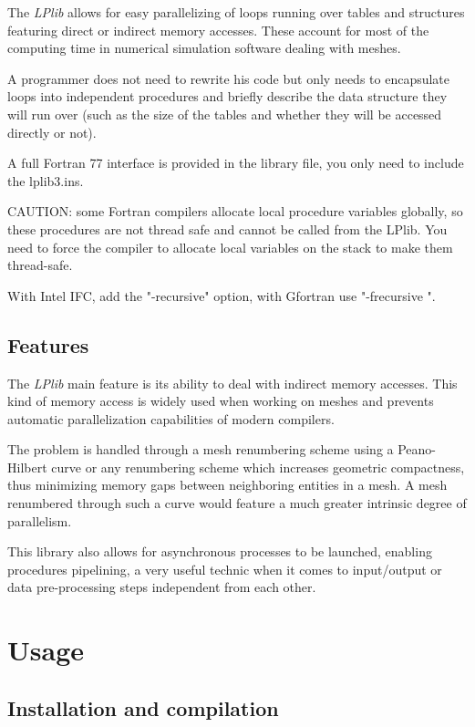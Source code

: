 \documentclass[a4paper,12pt]{article}
\begin{document}
The \emph{LPlib} allows for easy parallelizing of loops running over tables and structures featuring direct or indirect memory accesses. These account for most of the computing time in numerical simulation software dealing with meshes.

A programmer does not need to rewrite his code but only needs to encapsulate loops into independent procedures and briefly describe the data structure they will run over (such as the size of the tables and whether they will be accessed directly or not).

A full Fortran 77 interface is provided in the library file, you only need to include the lplib3.ins.

CAUTION: some Fortran compilers allocate local procedure variables globally, so these procedures are not thread safe and cannot be called from the LPlib.
You need to force the compiler to allocate local variables on the stack to make them thread-safe.

With Intel IFC, add the "-recursive" option, with Gfortran use "-frecursive ".

\subsection{Features}

The \emph{LPlib} main feature is its ability to deal with indirect memory accesses. This kind of memory access is widely used when working on meshes and prevents automatic parallelization capabilities of modern compilers.

The problem is handled through a mesh renumbering scheme using a Peano-Hilbert curve \cite{peano_hilbert} or any renumbering scheme which increases geometric compactness, thus minimizing memory gaps between neighboring entities in a mesh. A mesh renumbered through such a curve would feature a much greater intrinsic degree of parallelism.

This library also allows for asynchronous processes to be launched, enabling procedures pipelining, a very useful technic when it comes to input/output or data pre-processing steps independent from each other.


%
%

\section{Usage}

\subsection{Installation and compilation}
\end{document}
